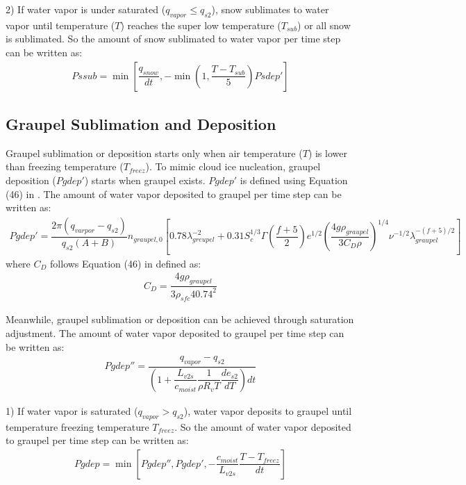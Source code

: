 \documentclass[letterpaper,titlepage,10pt]{article}
\numberwithin{equation}{section}
\begin{document}
2) If water vapor is under saturated ($q_{vapor} \leq q_{s2}$), snow sublimates to water vapor until temperature ($T$) reaches the super low temperature ($T_{sub}$) or all snow is sublimated. So the amount of snow sublimated to water vapor per time step can be written as:
\begin{gather}
	Pssub = \min \left[\dfrac{q_{snow}}{dt}, - \min \left(1, \dfrac{T - T_{sub}}{5} \right) Psdep' \right]
\end{gather}


\subsection{Graupel Sublimation and Deposition}

Graupel sublimation or deposition starts only when air temperature ($T$) is lower than freezing temperature ($T_{freez}$). To mimic cloud ice nucleation, graupel deposition ($Pgdep'$) starts when graupel exists. $Pgdep'$ is defined using Equation (46) in \citet{lin1983bulk}. The amount of water vapor deposited to graupel per time step can be written as:
\begin{gather}
	Pgdep' = \dfrac{2 \pi \left(q_{varpor} - q_{s2} \right)}{q_{s2} \left(A + B \right)} n_{graupel,0} \left[0.78 \lambda^{-2}_{greupel} + 0.31 S^{1/3}_c \Gamma \left(\dfrac{f + 5}{2} \right) e^{1/2} \left(\dfrac{4 g \rho_{graupel}}{3 C_D \rho} \right)^{1/4} \nu^{-1/2} \lambda^{- (f + 5) / 2}_{graupel} \right]
\end{gather}
where $C_D$ follows Equation (46) in \citet{lin1983bulk} defined as:
\begin{gather}
	C_D = \dfrac{4 g \rho_{graupel}}{3 \rho_{sfc} 40.74^2}
\end{gather}

Meanwhile, graupel sublimation or deposition can be achieved through saturation adjustment. The amount of water vapor deposited to graupel per time step can be written as:
\begin{gather}
	Pgdep'' = \dfrac{q_{vapor} - q_{s2}}{\left(1 + \dfrac{L_{v2s}}{c_{moist}} \dfrac{1}{\rho R_v T} \dfrac{de_{s2}}{dT} \right) dt}
\end{gather}

1) If water vapor is saturated ($q_{vapor} > q_{s2}$), water vapor deposits to graupel until temperature freezing temperature $T_{freez}$. So the amount of water vapor deposited to graupel per time step can be written as:
\begin{gather}
	Pgdep = \min \left[Pgdep'', Pgdep', - \dfrac{c_{moist}}{L_{v2s}} \dfrac{T - T_{freez}}{dt} \right]
\end{gather}
\end{document}
